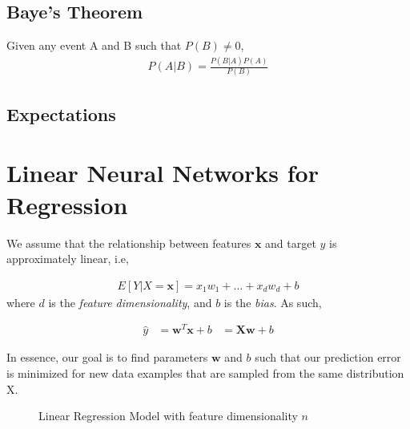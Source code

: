 \documentclass[a4paper,12pt]{article}
\theoremstyle{definition}
\begin{document}
\subsection*{Baye's Theorem}
Given any event A and B such that $P(B) \neq 0$,
\begin{align*}
    P(A|B) = \frac{P(B|A)P(A)}{P(B)}
\end{align*}

\subsection*{Expectations}

\section{Linear Neural Networks for Regression}
We assume that the relationship between features $\mathbf{x}$ and target $y$ is approximately linear, i.e,

\begin{align*}
    E[Y|X=\mathbf{x}] = x_1w_1 + \ldots + x_dw_d + b
\end{align*}
where $d$ is the \textit{feature dimensionality}, and $b$ is the \textit{bias}. As such,

\begin{align*}
    \hat{y} & = \mathbf{w}^T\mathbf{x} + b
            & = \mathbf{Xw} + b
\end{align*}

In essence, our goal is to find parameters $\mathbf{w}$ and $b$ such that our prediction error is
minimized for new data examples that are sampled from the same distribution X.
\begin{figure}[h]
    \centering
    \caption{Linear Regression Model with feature dimensionality $n$}
\end{figure}
\end{document}
